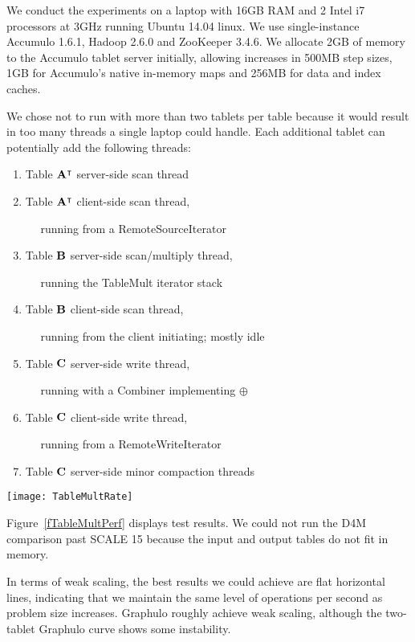 We conduct the experiments on a laptop with 16GB RAM and 2 Intel i7 processors at 3GHz
running Ubuntu 14.04 linux. We use single-instance Accumulo 1.6.1, Hadoop 2.6.0 and ZooKeeper 3.4.6.
We allocate 2GB of memory to the Accumulo tablet server initially, allowing increases in 500MB step sizes,
1GB for Accumulo's native in-memory maps and 256MB for data and index caches.


We chose not to run with more than two tablets per table because it would result in too many threads 
a single laptop could handle.  Each additional tablet can potentially add the following threads:
\begin{enumerate}
\item Table $\mathbf{A}^{\intercal}$ server-side scan thread
\item Table $\mathbf{A}^{\intercal}$ client-side scan thread,

$\quad$ running from a RemoteSourceIterator
\item Table $\mathbf{B}$ server-side scan/multiply thread,

$\quad$ running the TableMult iterator stack
\item Table $\mathbf{B}$ client-side scan thread, 

$\quad$ running from the client initiating; mostly idle
\item Table $\mathbf{C}$ server-side write thread,

$\quad$ running with a Combiner implementing $\oplus$
\item Table $\mathbf{C}$ client-side write thread,

$\quad$ running from a RemoteWriteIterator
\item Table $\mathbf{C}$ server-side minor compaction threads
\end{enumerate}

\begin{figure*}[h]
\centering
\texttt{[image: TableMultRate]}
\caption{Data flow through the TableMult iterator stack}
\label{fTableMultPerf}
\end{figure*}

Figure~\ref{fTableMultPerf} displays test results.
We could not run the D4M comparison past SCALE 15 because 
the input and output tables do not fit in memory.

In terms of weak scaling, the best results we could achieve are flat horizontal lines, 
indicating that we maintain the same level of operations per second as problem size increases.
Graphulo roughly achieve weak scaling, although the two-tablet Graphulo curve 
shows some instability.

